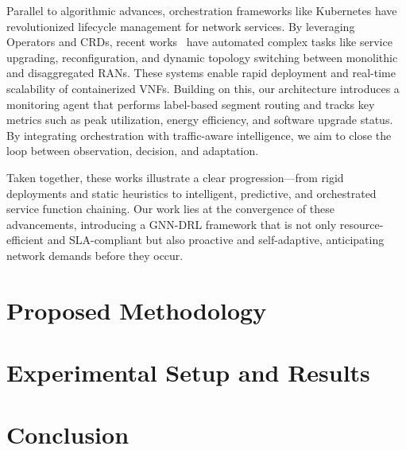 \documentclass[conference]{IEEEtran}
\begin{document}
	Parallel to algorithmic advances, orchestration frameworks like Kubernetes have revolutionized lifecycle management for network services. By leveraging Operators and CRDs, recent works~\cite{arouk2020cloud,wiranata2020automation} have automated complex tasks like service upgrading, reconfiguration, and dynamic topology switching between monolithic and disaggregated RANs. These systems enable rapid deployment and real-time scalability of containerized VNFs. Building on this, our architecture introduces a monitoring agent that performs label-based segment routing and tracks key metrics such as peak utilization, energy efficiency, and software upgrade status. By integrating orchestration with traffic-aware intelligence, we aim to close the loop between observation, decision, and adaptation.
	
	Taken together, these works illustrate a clear progression—from rigid deployments and static heuristics to intelligent, predictive, and orchestrated service function chaining. Our work lies at the convergence of these advancements, introducing a GNN-DRL framework that is not only resource-efficient and SLA-compliant but also proactive and self-adaptive, anticipating network demands before they occur.
	
	\section{Proposed Methodology}
	
	\section{Experimental Setup and Results}
	
	\section{Conclusion}
	
\end{document}
